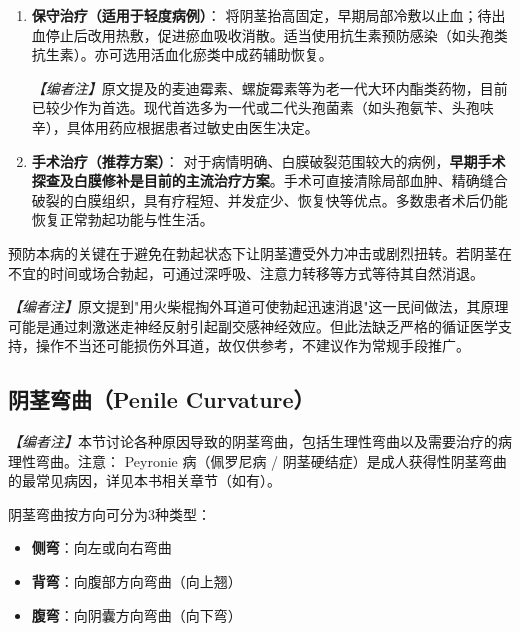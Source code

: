 \documentclass[12pt,a4paper,twoside]{ctexbook}
\begin{document}
\begin{enumerate}
	\item \textbf{保守治疗（适用于轻度病例）}：
	将阴茎抬高固定，早期局部冷敷以止血；待出血停止后改用热敷，促进瘀血吸收消散。适当使用抗生素预防感染（如头孢类抗生素）。亦可选用活血化瘀类中成药辅助恢复。

	\noindent\textit{【编者注】}原文提及的麦迪霉素、螺旋霉素等为老一代大环内酯类药物，目前已较少作为首选。现代首选多为一代或二代头孢菌素（如头孢氨苄、头孢呋辛），具体用药应根据患者过敏史由医生决定。

	\item \textbf{手术治疗（推荐方案）}：
	对于病情明确、白膜破裂范围较大的病例，\textbf{早期手术探查及白膜修补是目前的主流治疗方案}。手术可直接清除局部血肿、精确缝合破裂的白膜组织，具有疗程短、并发症少、恢复快等优点。多数患者术后仍能恢复正常勃起功能与性生活。
\end{enumerate}

\begin{tcolorbox}[colback=pink!5!white,colframe=red!50!black,title=贴心小叮咛]
预防本病的关键在于避免在勃起状态下让阴茎遭受外力冲击或剧烈扭转。若阴茎在不宜的时间或场合勃起，可通过深呼吸、注意力转移等方式等待其自然消退。

\noindent\textit{【编者注】}原文提到"用火柴棍掏外耳道可使勃起迅速消退"这一民间做法，其原理可能是通过刺激迷走神经反射引起副交感神经效应。但此法缺乏严格的循证医学支持，操作不当还可能损伤外耳道，故仅供参考，不建议作为常规手段推广。
\end{tcolorbox}

\subsection{阴茎弯曲（Penile Curvature）}
\label{subsec:penile_curvature}

\noindent\textit{【编者注】}本节讨论各种原因导致的阴茎弯曲，包括生理性弯曲以及需要治疗的病理性弯曲。注意： Peyronie 病（佩罗尼病 / 阴茎硬结症）是成人获得性阴茎弯曲的最常见病因，详见本书相关章节（如有）。

\vspace{0.5em}
阴茎弯曲按方向可分为3种类型：
\begin{itemize}
	\item \textbf{侧弯}：向左或向右弯曲
	\item \textbf{背弯}：向腹部方向弯曲（向上翘）
	\item \textbf{腹弯}：向阴囊方向弯曲（向下弯）
\end{itemize}
\end{document}
